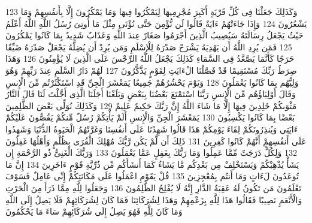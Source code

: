 {\tiny\colorbox{cl_aya}{123}} وَكَذَلِكَ جَعَلْنَا فِى كُلِّ قَرْيَةٍ أَكَبِرَ مُجْرِمِيهَا لِيَمْكُرُوا فِيهَا وَمَا يَمْكُرُونَ إِلَّا بِأَنفُسِهِمْ وَمَا يَشْعُرُونَ
{\tiny\colorbox{cl_aya}{124}} وَإِذَا جَاءَتْهُمْ ءَايَةٌ قَالُوا لَن نُّؤْمِنَ حَتَّى نُؤْتَى مِثْلَ مَا أُوتِىَ رُسُلُ اللَّهِ اللَّهُ أَعْلَمُ حَيْثُ يَجْعَلُ رِسَالَتَهُ سَيُصِيبُ الَّذِينَ أَجْرَمُوا صَغَارٌ عِندَ اللَّهِ وَعَذَابٌ شَدِيدٌ بِمَا كَانُوا يَمْكُرُونَ
{\tiny\colorbox{cl_aya}{125}} فَمَن يُرِدِ اللَّهُ أَن يَهْدِيَهُ يَشْرَحْ صَدْرَهُ لِلْإِسْلَمِ وَمَن يُرِدْ أَن يُضِلَّهُ يَجْعَلْ صَدْرَهُ ضَيِّقًا حَرَجًا كَأَنَّمَا يَصَّعَّدُ فِى السَّمَاءِ كَذَلِكَ يَجْعَلُ اللَّهُ الرِّجْسَ عَلَى الَّذِينَ لَا يُؤْمِنُونَ
{\tiny\colorbox{cl_aya}{126}} وَهَذَا صِرَطُ رَبِّكَ مُسْتَقِيمًا قَدْ فَصَّلْنَا الْءَايَتِ لِقَوْمٍ يَذَّكَّرُونَ
{\tiny\colorbox{cl_aya}{127}} لَهُمْ دَارُ السَّلَمِ عِندَ رَبِّهِمْ وَهُوَ وَلِيُّهُم بِمَا كَانُوا يَعْمَلُونَ
{\tiny\colorbox{cl_aya}{128}} وَيَوْمَ يَحْشُرُهُمْ جَمِيعًا يَمَعْشَرَ الْجِنِّ قَدِ اسْتَكْثَرْتُم مِّنَ الْإِنسِ وَقَالَ أَوْلِيَاؤُهُم مِّنَ الْإِنسِ رَبَّنَا اسْتَمْتَعَ بَعْضُنَا بِبَعْضٍ وَبَلَغْنَا أَجَلَنَا الَّذِى أَجَّلْتَ لَنَا قَالَ النَّارُ مَثْوَىكُمْ خَلِدِينَ فِيهَا إِلَّا مَا شَاءَ اللَّهُ إِنَّ رَبَّكَ حَكِيمٌ عَلِيمٌ
{\tiny\colorbox{cl_aya}{129}} وَكَذَلِكَ نُوَلِّى بَعْضَ الظَّلِمِينَ بَعْضًا بِمَا كَانُوا يَكْسِبُونَ
{\tiny\colorbox{cl_aya}{130}} يَمَعْشَرَ الْجِنِّ وَالْإِنسِ أَلَمْ يَأْتِكُمْ رُسُلٌ مِّنكُمْ يَقُصُّونَ عَلَيْكُمْ ءَايَتِى وَيُنذِرُونَكُمْ لِقَاءَ يَوْمِكُمْ هَذَا قَالُوا شَهِدْنَا عَلَى أَنفُسِنَا وَغَرَّتْهُمُ الْحَيَوةُ الدُّنْيَا وَشَهِدُوا عَلَى أَنفُسِهِمْ أَنَّهُمْ كَانُوا كَفِرِينَ
{\tiny\colorbox{cl_aya}{131}} ذَلِكَ أَن لَّمْ يَكُن رَّبُّكَ مُهْلِكَ الْقُرَى بِظُلْمٍ وَأَهْلُهَا غَفِلُونَ
{\tiny\colorbox{cl_aya}{132}} وَلِكُلٍّ دَرَجَتٌ مِّمَّا عَمِلُوا وَمَا رَبُّكَ بِغَفِلٍ عَمَّا يَعْمَلُونَ
{\tiny\colorbox{cl_aya}{133}} وَرَبُّكَ الْغَنِىُّ ذُو الرَّحْمَةِ إِن يَشَأْ يُذْهِبْكُمْ وَيَسْتَخْلِفْ مِن بَعْدِكُم مَّا يَشَاءُ كَمَا أَنشَأَكُم مِّن ذُرِّيَّةِ قَوْمٍ ءَاخَرِينَ
{\tiny\colorbox{cl_aya}{134}} إِنَّ مَا تُوعَدُونَ لَءَاتٍ وَمَا أَنتُم بِمُعْجِزِينَ
{\tiny\colorbox{cl_aya}{135}} قُلْ يَقَوْمِ اعْمَلُوا عَلَى مَكَانَتِكُمْ إِنِّى عَامِلٌ فَسَوْفَ تَعْلَمُونَ مَن تَكُونُ لَهُ عَقِبَةُ الدَّارِ إِنَّهُ لَا يُفْلِحُ الظَّلِمُونَ
{\tiny\colorbox{cl_aya}{136}} وَجَعَلُوا لِلَّهِ مِمَّا ذَرَأَ مِنَ الْحَرْثِ وَالْأَنْعَمِ نَصِيبًا فَقَالُوا هَذَا لِلَّهِ بِزَعْمِهِمْ وَهَذَا لِشُرَكَائِنَا فَمَا كَانَ لِشُرَكَائِهِمْ فَلَا يَصِلُ إِلَى اللَّهِ وَمَا كَانَ لِلَّهِ فَهُوَ يَصِلُ إِلَى شُرَكَائِهِمْ سَاءَ مَا يَحْكُمُونَ
